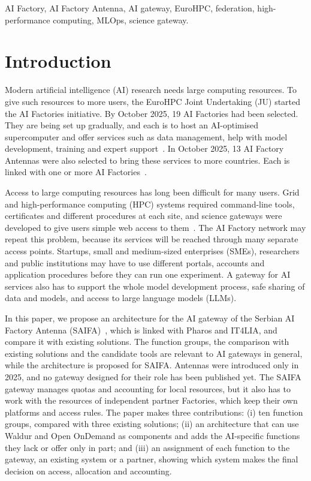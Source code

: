 \documentclass[conference,a4paper]{IEEEtran}
\newif\ifizmene
\DeclareRobustCommand{\roz}[1]{#1}
\DeclareRobustCommand{\nov}[1]{#1}
\DeclareRobustCommand{\tri}[1]{#1}
\DeclareRobustCommand{\fin}[1]{\ifizmene{\color{finalna}#1}\else#1\fi}
\begin{document}
\begin{IEEEkeywords}
AI Factory, AI Factory Antenna, AI gateway, EuroHPC, federation, high-performance computing, MLOps, science gateway.
\end{IEEEkeywords}

\section{Introduction}

Modern artificial intelligence (AI) research needs large computing resources. To give such resources to more users, the EuroHPC Joint Undertaking (JU) started the AI Factories initiative. By October 2025, 19 AI Factories had been selected. \nov{They are being set up gradually, and each is to host an AI-optimised supercomputer and offer} \roz{services such as data management, help with model development, training} and expert support~\cite{eurohpc_aif,eurohpc_six_aif}. In October 2025, 13 AI Factory Antennas were also selected to bring these services to more countries. Each is linked with one or more AI Factories~\cite{eurohpc_antennas,eurohpc_antennas_page}.

\nov{Access to large computing resources has long been difficult for many users. Grid and high-performance computing (HPC) systems required command-line tools, certificates and different procedures at each site, and science gateways were developed to give users simple web access to them}~\cite{wilkinsdiehr2007,hudak2018ood}\nov{. The AI Factory network may repeat this problem, because its services will be reached through many separate access points. Startups, small and medium-sized enterprises (SMEs), researchers and public institutions may have to use different portals, accounts and application procedures before they can run one experiment. A gateway for AI services also has to support the whole model development process, safe sharing of data and models, and access to large language models (LLMs).}

\nov{In this paper, we propose an architecture for the AI gateway of the Serbian AI Factory Antenna (SAIFA)~\cite{cordis_saifa,saifa_d31}, which is linked with Pharos and IT4LIA, and compare it with existing solutions. The function groups, the comparison with existing solutions and the candidate tools are relevant to AI gateways in general, while the architecture is proposed for SAIFA. Antennas were introduced only in 2025, and \tri{no gateway designed for their role has been published yet}. The SAIFA gateway manages quotas and accounting for local resources, but it also has to work with the resources of independent partner Factories, which keep their own platforms and access rules. \fin{The paper makes three contributions: (i) ten function groups, compared with three existing solutions; (ii) an architecture that can use Waldur and Open OnDemand as components and adds the AI-specific functions they lack or offer only in part; and (iii) an assignment of each function to the gateway, an existing system or a partner, showing which system makes the final decision on access, allocation and accounting.}}
\end{document}
